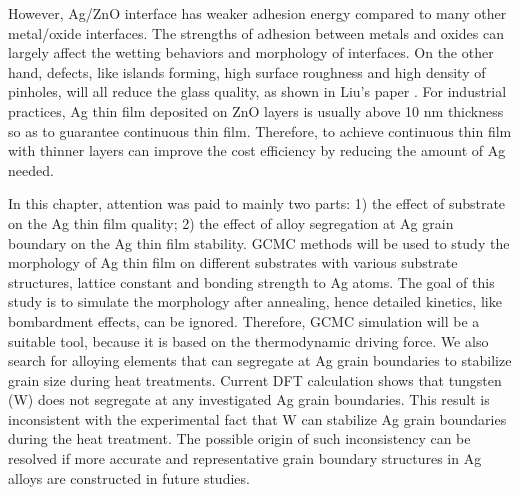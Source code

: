 However, Ag/ZnO interface has weaker adhesion energy compared to many other metal/oxide interfaces. The strengths of adhesion between metals and oxides can largely affect the wetting behaviors and morphology of interfaces. On the other hand, defects, like islands forming, high surface roughness and high density of pinholes, will all reduce the glass quality, as shown in Liu's paper \cite{liu2013lithography}. For industrial practices, Ag thin film deposited on ZnO layers is usually above 10 nm thickness so as to guarantee continuous thin film. Therefore, to achieve continuous thin film with thinner layers can improve the cost efficiency by reducing the amount of Ag needed.

In this chapter, attention was paid to mainly two parts: 1) the effect of substrate on the Ag thin film quality; 2) the effect of alloy segregation at Ag grain boundary on the Ag thin film stability. \ac{GCMC} methods will be used to study the morphology of Ag thin film on different substrates with various substrate structures, lattice constant and bonding strength to Ag atoms. The goal of this study is to simulate the morphology after annealing, hence detailed kinetics, like bombardment effects, can be ignored. Therefore, \ac{GCMC} simulation will be a suitable tool, because it is based on the thermodynamic driving force. We also search for alloying elements that can segregate at Ag grain boundaries to stabilize grain size during heat treatments. Current \ac{DFT} calculation shows that tungsten (W) does not segregate at any investigated Ag grain boundaries. This result is inconsistent with the experimental fact that W can stabilize Ag grain boundaries during the heat treatment. The possible origin of such inconsistency can be resolved if more accurate and representative grain boundary structures in Ag alloys are constructed in future studies.
